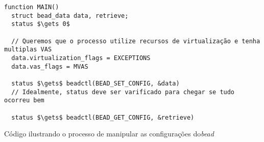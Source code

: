 \begin{pseudocode}

\begin{lstlisting}[language=pseudocode, style=pseudocode]
function MAIN()
  struct bead_data data, retrieve;
  status $\gets 0$

  // Queremos que o processo utilize recursos de virtualização e tenha multiplas VAS
  data.virtualization_flags = EXCEPTIONS
  data.vas_flags = MVAS

  status $\gets$ beadctl(BEAD_SET_CONFIG, &data)
  // Idealmente, status deve ser varificado para chegar se tudo ocorreu bem

  status $\gets$ beadctl(BEAD_GET_CONFIG, &retrieve)

\end{lstlisting}

  \label{alg:exconfig}
  \caption{Código ilustrando o processo de manipular as configurações  do\emph{bead}}
\end{pseudocode}
